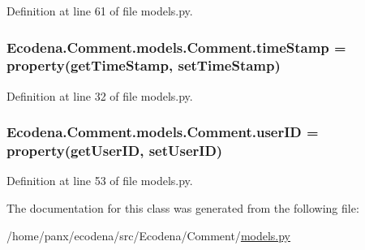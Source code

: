 Definition at line 61 of file models.py.

\hypertarget{class_ecodena_1_1_comment_1_1models_1_1_comment_af16a82189e30fcc76535a7306def5b6e}{
\subsubsection[{timeStamp}]{\setlength{\rightskip}{0pt plus 5cm}Ecodena.Comment.models.Comment.timeStamp = property(getTimeStamp, setTimeStamp)}}
\label{d9/d86/class_ecodena_1_1_comment_1_1models_1_1_comment_af16a82189e30fcc76535a7306def5b6e}


Definition at line 32 of file models.py.

\hypertarget{class_ecodena_1_1_comment_1_1models_1_1_comment_a4de8b42ef11e406759040ca2a7c18d52}{
\subsubsection[{userID}]{\setlength{\rightskip}{0pt plus 5cm}Ecodena.Comment.models.Comment.userID = property(getUserID, setUserID)}}
\label{d9/d86/class_ecodena_1_1_comment_1_1models_1_1_comment_a4de8b42ef11e406759040ca2a7c18d52}


Definition at line 53 of file models.py.



The documentation for this class was generated from the following file:\begin{DoxyCompactItemize}
\item 
/home/panx/ecodena/src/Ecodena/Comment/\hyperlink{_comment_2models_8py}{models.py}\end{DoxyCompactItemize}
